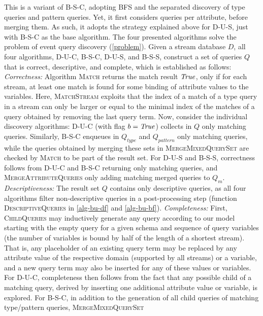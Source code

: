 This is a variant of B-S-C, adopting BFS and the separated
discovery of type queries and pattern queries. Yet, it first considers
queries per attribute, before merging them. As such, it
adopts the strategy explained above for D-U-S, just with B-S-C as the base
algorithm.
The four presented algorithms solve the problem of event query
discovery (\autoref{problem}). Given a stream database $D$, all four
algorithms,
D-U-C, B-S-C, D-U-S, and B-S-S, construct a set of queries $Q$ that is
correct, descriptive, and complete, which
is established as follows:
\emph{Correctness:} Algorithm \textsc{Match} returns the match result
$\mathit{True}$, only if for each stream, at least one match is found for some
binding of attribute values to the variables. Here, \textsc{MatchStream}
exploits that the index of a match of a type query in a stream can only be
larger or equal to the minimal index of the matches of a query obtained by
removing the last query term. Now, consider the individual discovery
algorithms: D-U-C (with flag $b=\mathit{True}$) collects in $Q$ only matching
queries. Similarly, B-S-C enqueues in $Q_{\mathit{type}}$ and
$Q_{\mathit{pattern}}$ only matching queries, while the queries obtained by
merging these sets in
\textsc{MergeMixedQuerySet} are checked by \textsc{Match} to
be part of the result set. For D-U-S and B-S-S, correctness follows from
D-U-C and B-S-C returning only matching queries, and
\textsc{MergeAttributeQueries} only adding matching merged queries to
$Q_m$.
\emph{Descriptiveness:} The result set ${Q}$ contains only descriptive
queries, as all four
algorithms filter non-descriptive queries in a post-pro\-ces\-sing step
(function \textsc{DescriptiveQueries} in \autoref{alg-bu-df} and
\autoref{alg-bu-bf}).
\emph{Completeness:} First, \textsc{ChildQueries} may inductively
generate any query according to our model starting with the empty query for
a given schema and sequence of query variables (the number of variables is
bound by half of the length of a shortest stream). That is, any placeholder
of an existing query term may be replaced by any attribute value of the
respective domain (supported by all streams) or a variable, and a new query
term may also be inserted for any of these values or variables.
For D-U-C, completeness then follows from the fact that any possible child
of a matching query, derived by inserting one additional attribute value or
variable,
is explored. For B-S-C, in addition to the generation of all child queries
of matching type/pattern queries, \textsc{MergeMixedQuerySet}
